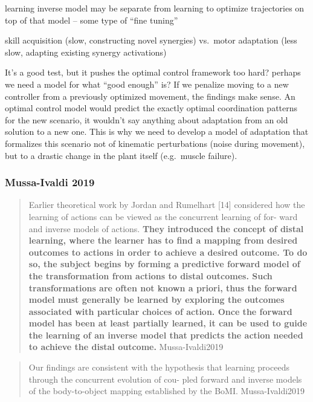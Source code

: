 \documentclass[../main.tex]{subfiles}
\begin{document}
learning inverse model may be separate from learning to optimize trajectories on top of that model -- some type of ``fine tuning''

skill acquisition (slow, constructing novel synergies) vs.~motor adaptation (less slow, adapting existing synergy activations)

It's a good test, but it pushes the optimal control framework too hard? perhaps we need a model for what ``good enough'' is? If we penalize moving to a new controller from a previously optimized movement, the findings make sense. An optimal control model would predict the exactly optimal coordination patterns for the new scenario, it wouldn't say anything about adaptation from an old solution to a new one. This is why we need to develop a model of adaptation that formalizes this scenario not of kinematic perturbations (noise during movement), but to a drastic change in the plant itself (e.g.~muscle failure).

\subsubsection{Mussa-Ivaldi 2019}\label{mussa-ivaldi-2019}

\begin{quote}
Earlier theoretical work by Jordan and Rumelhart {[}14{]} considered how the learning of actions can be viewed as the concurrent learning of for- ward and inverse models of actions. \textbf{They introduced the concept of distal learning, where the learner has to find a mapping from desired outcomes to actions in order to achieve a desired outcome. To do so, the subject begins by forming a predictive forward model of the transformation from actions to distal outcomes. Such transformations are often not known a priori, thus the forward model must generally be learned by exploring the outcomes associated with particular choices of action. Once the forward model has been at least partially learned, it can be used to guide the learning of an inverse model that predicts the action needed to achieve the distal outcome.} Mussa-Ivaldi2019
\end{quote}

\begin{quote}
Our findings are consistent with the hypothesis that learning proceeds through the concurrent evolution of cou- pled forward and inverse models of the body-to-object mapping established by the BoMI. Mussa-Ivaldi2019
\end{quote}
\end{document}

